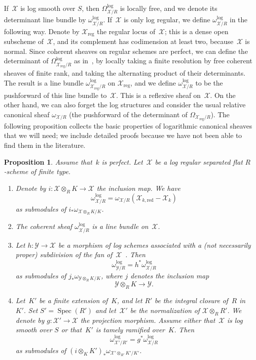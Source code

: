 \documentclass[JEP,XML,SOM,Unicode,NoFloatCountersInSection]{cedram}
\newtheorem{prop}[equation]{Proposition}
\theoremstyle{definition}
\numberwithin{equation}{subsection}
\newcommand{\cX}{\ensuremath{\mathscr{X}}}
\newcommand{\cY}{\ensuremath{\mathscr{Y}}}
\newcommand{\red}{\mathrm{red}}
\newcommand{\reg}{\mathrm{reg}}
\DeclareMathOperator{\Spec}{Spec}
\begin{document}
If~$\cX$ is log smooth over $S$, then $\Omega^{\log}_{\cX/R}$ is locally free, and we denote its determinant line bundle by
$\omega_{\cX/R}^{\log}$.
If~$\cX$ is only log regular, we define $\omega_{\cX/R}^{\log}$ in the following way. Denote by $\cX_{\reg}$ the regular locus of~$\cX$; this is a dense open subscheme of~$\cX$, and its complement has codimension at least two, because~$\cX$ is normal. Since coherent sheaves on regular schemes are perfect, we can define the determinant of $\Omega^{\log}_{\cX_{\reg}/R}$ as in~\cite{knudsen-mumford}, by locally taking a finite resolution by free coherent sheaves of finite rank, and taking the alternating product of their determinants. The result is a line bundle $\omega_{\cX_{\reg}/R}^{\log}$ on $\cX_{\reg}$, and we define $\omega^{\log}_{\cX/R}$ to be the pushforward of this line bundle to~$\cX$. This is a reflexive sheaf on~$\cX$. On the other hand, we can also forget the log structures and consider the usual relative canonical sheaf $\omega_{\cX/R}$ (the pushforward of the determinant of
$\Omega_{\cX_{\reg}/R}$). The following proposition collects the basic properties of logarithmic canonical sheaves that we will need; we include detailed proofs because we have not been able to find them in the literature.

\begin{prop}\label{prop:can}
Assume that~$k$ is perfect.
Let~$\cX$ be a log regular separated flat $R$\nobreakdash-scheme of finite type.
\begin{enumerate}
\item \label{it:logcan} Denote by $i\colon \cX\otimes_R K\to \cX$ the inclusion map. We have
\[
\omega^{\log}_{\cX/R}=\omega_{\cX/R}(\cX_{k,\red}-\cX_k)
\]
as submodules of $i_\ast \omega_{\cX\otimes_R K/K}$.
\item \label{it:lineb} The coherent sheaf $\omega^{\log}_{\cX/R}$ is a line bundle on~$\cX$.
\item \label{it:loget}
Let $h\colon \cY\to \cX$ be a morphism of log schemes associated with a (not necessarily proper) subdivision of the fan of~$\cX$~\cite[9.9]{kato}. Then
\[
\omega^{\log}_{\cY/R}=h^{\ast}\omega^{\log}_{\cX/R}
\]
as submodules of $j_\ast \omega_{\cY\otimes_R K/K}$, where $j$ denotes the inclusion map
\[
\cY\otimes_R K\to \cY.
\]
\item \label{it:canbc} Let~$K'$ be a finite extension of~$K$, and let $R'$ be the integral closure of~$R$ in~$K'$.
Set $S'=\Spec(R')$ and let~$\cX'$ be the normalization of $\cX\otimes_R R'$. We denote by $g\colon \cX'\to \cX$ the projection morphism.
Assume either that~$\cX$ is log smooth over $S$ or that~$K'$ is tamely ramified over~$K$.
Then
\[
\omega^{\log}_{\cX'/R'}=g^{\ast}\omega^{\log}_{\cX/R}
\]
as submodules of $(i\otimes_K K')_\ast \omega_{\cX'\otimes_{R'} K'/K'}$.
\end{enumerate}
\end{prop}
\end{document}
